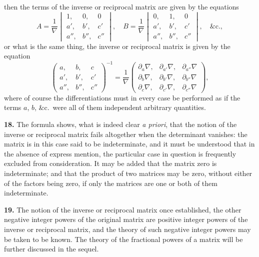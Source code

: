 \documentclass[12pt,a4paper]{article}
\theoremstyle{definition}
\begin{document}
then the terms of the inverse or reciprocal matrix are given by the equations
\[
A = \frac{1}{\nabla}\begin{vmatrix} 1, & 0, & 0 \\ a', & b', & c' \\ a'', & b'', & c'' \end{vmatrix},\quad
B = \frac{1}{\nabla}\begin{vmatrix} 0, & 1, & 0 \\ a', & b', & c' \\ a'', & b'', & c'' \end{vmatrix},\quad \&\text{c.},
\]
or what is the same thing, the inverse or reciprocal matrix is given by the equation
\[
\begin{pmatrix} a, & b, & c \\ a', & b', & c' \\ a'', & b'', & c'' \end{pmatrix}^{-1}
= \frac{1}{\nabla}
\begin{pmatrix}
\partial_a \nabla, & \partial_{a'} \nabla, & \partial_{a''} \nabla \\
\partial_b \nabla, & \partial_{b'} \nabla, & \partial_{b''} \nabla \\
\partial_c \nabla, & \partial_{c'} \nabla, & \partial_{c''} \nabla
\end{pmatrix},
\]
where of course the differentiations must in every case be performed as if the terms $a$, $b$, \&c.\ were all of them independent arbitrary quantities.

\newpage

\medskip
\noindent\textbf{18.} The formula shows, what is indeed clear \textit{a priori}, that the notion of the inverse or reciprocal matrix fails altogether when the determinant vanishes: the matrix is in this case said to be indeterminate, and it must be understood that in the absence of express mention, the particular case in question is frequently excluded from consideration. It may be added that the matrix zero is indeterminate; and that the product of two matrices may be zero, without either of the factors being zero, if only the matrices are one or both of them indeterminate.

\medskip
\noindent\textbf{19.} The notion of the inverse or reciprocal matrix once established, the other negative integer powers of the original matrix are positive integer powers of the inverse or reciprocal matrix, and the theory of such negative integer powers may be taken to be known. The theory of the fractional powers of a matrix will be further discussed in the sequel.
\end{document}
